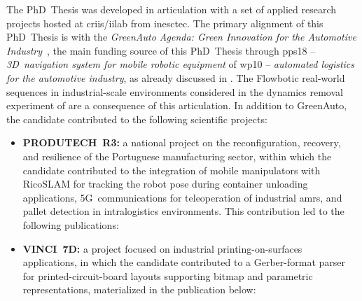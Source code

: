 The PhD~Thesis was developed in articulation with a set of
applied research projects hosted at \gls{criis}/\gls{iilab} from \gls{inesctec}.
The primary alignment of this PhD~Thesis is with the
\textit{GreenAuto Agenda: Green Innovation for the Automotive Industry}~\cite{greenauto},
the main funding source of this PhD~Thesis through \gls{pps}18 -- \textit{3D~navigation system
for mobile robotic equipment} of \gls{wp}10 -- \textit{automated
logistics for the automotive industry}, as already discussed in
. The Flowbotic real-world sequences in industrial-scale
environments considered in the dynamics removal experiment of
 are a consequence of this
articulation. In addition to GreenAuto, the candidate contributed to the
following scientific projects:
\begin{itemize}
\item \textbf{PRODUTECH~R3:} a national project on the
      reconfiguration, recovery, and resilience of the Portuguese
      manufacturing sector, within which the candidate contributed to
      the integration of mobile manipulators with RicoSLAM for tracking the
      robot pose during container unloading applications, 5G~communications
      for teleoperation of industrial \glspl{amr}, and pallet detection in
      intralogistics environments.
      This contribution led to the following publications:
\item \textbf{VINCI~7D:} a project focused on industrial printing-on-surfaces
      applications, in which the candidate contributed to a
      Gerber-format parser for printed-circuit-board layouts supporting bitmap
      and parametric representations, materialized in the publication below:
\end{itemize}

